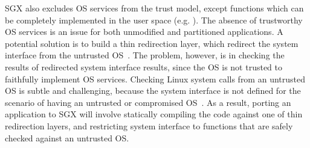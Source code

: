 SGX also excludes OS services from the trust model, except functions which can be completely implemented in the user space (e.g. ).
The absence of trustworthy OS services is an issue for both unmodified and partitioned applications.
A potential solution is to build a thin redirection layer, which redirect the system interface
from the untrusted OS~\cite{osdi16scone,shinde17panoply}.
The problem, however, is in checking the results of redirected system interface results, since the OS is not trusted to faithfully implement OS services.
Checking Linux system calls from an untrusted OS is subtle and challenging, because the system interface is not defined for the scenario of having an untrusted or compromised OS~\cite{checkoway13iago}.
As a result, porting an application to SGX will involve
statically compiling the code against one of thin redirection layers, and
restricting system interface to functions that are safely checked
against an untrusted OS.



